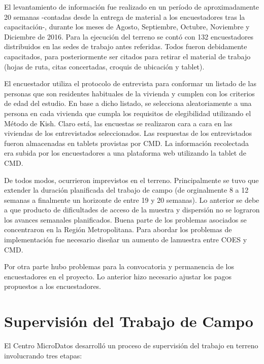 \documentclass[
]{book}
\begin{document}
El levantamiento de información fue realizado en un período de aproximadamente 20 semanas -contadas desde la entrega de material a los encuestadores tras la capacitación-, durante los meses de Agosto, Septiembre, Octubre, Noviembre y Diciembre de 2016. Para la ejecución del terreno se contó con 132 encuestadores distribuidos en las sedes de trabajo antes referidas. Todos fueron debidamente capacitados, para posteriormente ser citados para retirar el material de trabajo (hojas de ruta, citas concertadas, croquis de ubicación y tablet).

El encuestador utiliza el protocolo de entrevista para conformar un listado de las personas que son residentes habituales de la vivienda y cumplen con los criterios de edad del estudio. En base a dicho listado, se selecciona aleatoriamente a una persona en cada vivienda que cumpla los requisitos de elegibilidad utilizando el Método de Kish. Claro está, las encuestas se realizaron cara a cara en las viviendas de los entrevistados seleccionados. Las respuestas de los entrevistados fueron almacenadas en tablets provistas por CMD. La información recolectada era subida por los encuestadores a una plataforma web utilizando la tablet de CMD.

De todos modos, ocurrieron imprevistos en el terreno. Principalmente se tuvo que extender la duración planificada del trabajo de campo (de orginalmente 8 a 12 semanas a finalmente un horizonte de entre 19 y 20 semanas). Lo anterior se debe a que producto de dificultades de acceso de la muestra y dispersión no se lograron los avances semanales planificados. Buena parte de los problemas asociados se concentraron en la Región Metropolitana. Para abordar los problemas de implementación fue necesario diseñar un aumento de lamuestra entre COES y CMD.

Por otra parte hubo problemas para la convocatoria y permanencia de los encuestadores en el proyecto. Lo anterior hizo necesario ajustar los pagos propuestos a los encuestadores.

\hypertarget{supervisiuxf3n-del-trabajo-de-campo}{%
\section{Supervisión del Trabajo de Campo}\label{supervisiuxf3n-del-trabajo-de-campo}}

El Centro MicroDatos desarrolló un proceso de supervisión del trabajo en terreno involucrando tres etapas:
\end{document}
